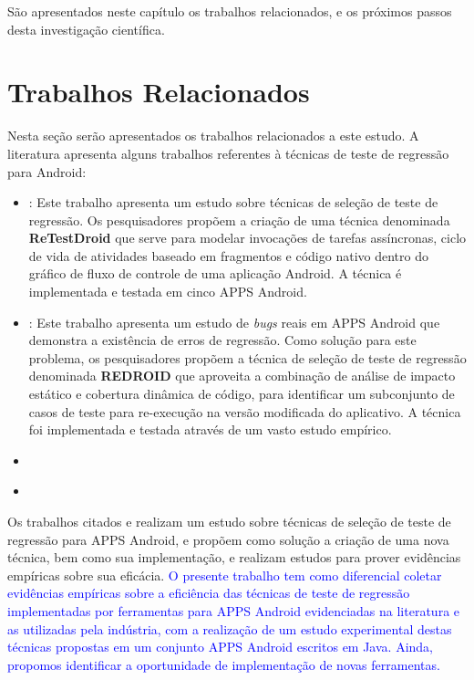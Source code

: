 \acresetall
São apresentados neste capítulo os trabalhos relacionados, e os próximos passos desta investigação científica.

\section{Trabalhos Relacionados}

Nesta seção serão apresentados os trabalhos relacionados a este estudo. A literatura apresenta alguns trabalhos referentes à técnicas de teste de regressão para Android:

\begin{itemize}
    
    \item \cite{8377661}: Este trabalho apresenta um estudo sobre técnicas de seleção de teste de regressão. Os pesquisadores propõem a criação de uma técnica denominada \textbf{ReTestDroid} que serve para modelar invocações de tarefas assíncronas, ciclo de vida de atividades baseado em fragmentos e código nativo dentro do gráfico de fluxo de controle de uma aplicação Android. A técnica é implementada e testada em cinco \ac{APPS} Android.
    
    \item \cite{Do2016RedroidAR}: Este trabalho apresenta um estudo de \textit{bugs} reais em \ac{APPS} Android que demonstra a existência de erros de regressão. Como solução para este problema, os pesquisadores propõem a técnica de seleção de teste de regressão denominada \textbf{REDROID} que aproveita a combinação de análise de impacto estático e cobertura dinâmica de código, para identificar um subconjunto de casos de teste para re-execução na versão modificada do aplicativo. A técnica foi implementada e testada através de um vasto estudo empírico.
    
    \item \cite{7102609}
    \item \cite{8094467}
    
\end{itemize}
    
    Os trabalhos citados \cite{8377661} e \cite{Do2016RedroidAR} realizam um estudo sobre técnicas de seleção de teste de regressão para \ac{APPS} Android, e propõem como solução a criação de uma nova técnica, bem como sua implementação, e realizam estudos para prover evidências empíricas sobre sua eficácia. \textcolor{blue}{O presente trabalho tem como diferencial coletar evidências empíricas sobre a eficiência das técnicas de teste de regressão implementadas por ferramentas para \ac{APPS} Android evidenciadas na literatura e as utilizadas pela indústria, com a realização de um estudo experimental destas técnicas propostas em um conjunto \ac{APPS} Android escritos em Java. Ainda, propomos identificar a oportunidade de implementação de novas ferramentas.}


